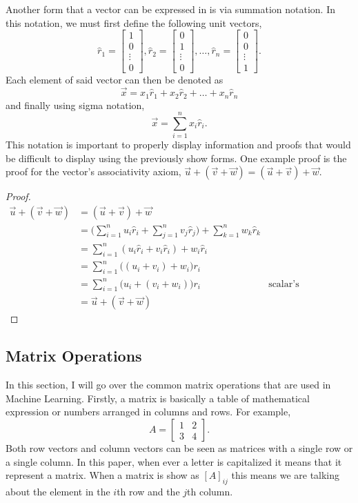 Another form that a vector can be expressed in is via summation notation. In this notation, we must first define the following unit vectors, $$\hat{r}_1=\begin{bmatrix}1 \\ 0 \\ \vdots \\ 0\end{bmatrix},\hat{r}_2=\begin{bmatrix}0 \\ 1 \\ \vdots \\ 0\end{bmatrix},\dots,\hat{r}_n=\begin{bmatrix}0 \\ 0 \\ \vdots \\ 1\end{bmatrix} .$$ Each element of said vector can then be denoted as $$\vec{x}=x_1 \hat{r}_1 + x_2 \hat{r}_2 + \dots + x_n \hat{r}_n$$ and finally using sigma notation, $$\vec{x}=\sum_{i=1}^n x_i \hat{r}_i.$$ This notation is important to properly display information and proofs that would be difficult to display using the previously show forms. One example proof is the proof for the vector's associativity axiom, $\vec{u}+(\vec{v}+\vec{w})=(\vec{u}+\vec{v})+\vec{w}$.
\begin{proof}
\begin{align*}
\vec{u}+(\vec{v}+\vec{w})&=(\vec{u}+\vec{v})+\vec{w} \\
&=\bigg(\sum_{i=1}^nu_i \hat{r}_i+\sum_{j=1}^n v_j \hat{r}_j\bigg)+\sum_{k=1}^n w_k \hat{r}_k\\
&=\sum_{i=1}^n (u_i\hat{r}_i + v_i\hat{r}_i) + w_i\hat{r}_i\\
&=\sum_{i=1}^n \big((u_i + v_i) + w_i\big)r_i\\
&=\sum_{i=1}^n \big(u_i+(v_i+w_i)\big)r_i&\text{scalar's associativity}\\
&=\vec{u}+(\vec{v}+\vec{w})
\end{align*}
\end{proof}

\subsection{Matrix Operations}

In this section, I will go over the common matrix operations that are used in Machine Learning. Firstly, a matrix is basically a table of mathematical expression or numbers arranged in columns and rows. For example, $$A=\begin{bmatrix} 1 & 2 \\ 3 & 4 \end{bmatrix}.$$ Both row vectors and column vectors can be seen as matrices with a single row or a single column. In this paper, when ever a letter is capitalized it means that it represent a matrix. When a matrix is show as $[A]_{ij}$ this means we are talking about the element in the $i$th row and the $j$th column.

